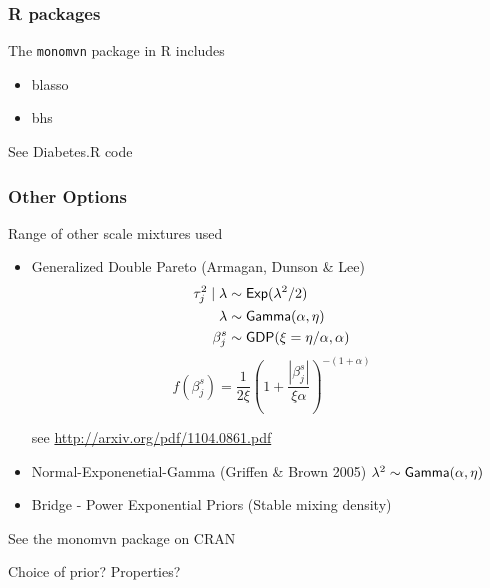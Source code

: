 \documentclass[]{beamer}
\begin{document}
\begin{frame}
  \frametitle{R packages}
  The {\tt monomvn} package in R includes
  \begin{itemize}
  \item blasso
  \item bhs
  \end{itemize}

See Diabetes.R code



\end{frame}




\begin{frame}
  \frametitle{Other Options}
  Range of other scale mixtures used  \pause
  \begin{itemize}
  \item Generalized Double Pareto (Armagan, Dunson \& Lee)  \pause
\begin{align*}
 \tau_j^2 \mid \lambda & \sim \textsf{Exp}(\lambda^2/2) \\
  \lambda & \sim \textsf{Gamma}(\alpha, \eta) \\
  \beta^s_j & \sim \textsf{GDP}(\xi = \eta/\alpha, \alpha)
\end{align*}
\pause
$$
f(\beta^s_j) = \frac{1}{2 \xi} (1 + \frac{|\beta^s_j|}{\xi \alpha})^{-(1 + \alpha)}
$$

see \url{http://arxiv.org/pdf/1104.0861.pdf} \pause
  \item Normal-Exponenetial-Gamma (Griffen \& Brown 2005)
$\lambda^2 \sim \textsf{Gamma}(\alpha, \eta)$
  \pause
  \item Bridge - Power Exponential Priors  (Stable mixing density) \pause

   \end{itemize}
See the monomvn package on CRAN \pause

\vfill

Choice of prior?   Properties?
\end{frame}
\end{document}
